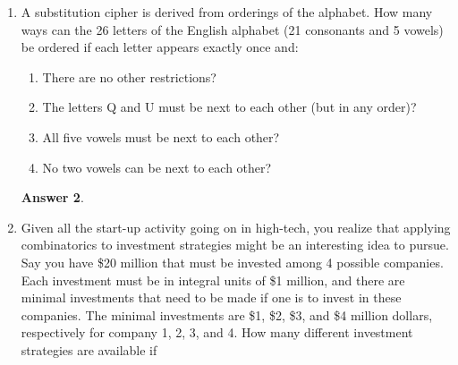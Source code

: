 \documentclass[12pt]{article}
\renewcommand{\(}{\left(}
\renewcommand{\)}{\right)}
\theoremstyle{definition}
\newtheorem*{answer}{Answer}
\begin{document}
\begin{enumerate}
\begin{enumerate}[label=\alph*.]
\item there are no additional restrictions on which species can be selected?
\item 2 particular bird species cannot be placed together (e.g., they have a predator-prey relationship)?
\item 1 particular bird species and 1 particular reptile species cannot be placed together?

\end{enumerate}

    \begin{shaded}
    \begin{answer}

    \end{answer}
    \end{shaded}
    \newpage


\item A substitution cipher is derived from orderings of the alphabet. How many ways can
the 26 letters of the English alphabet (21 consonants and 5 vowels) be ordered if each letter appears exactly once and:
    \begin{enumerate}[label=\alph*.]

    \item There are no other restrictions?
    \item The letters Q and U must be next to each other (but in any order)?
    \item All five vowels must be next to each other?
    \item No two vowels can be next to each other?

    \end{enumerate}

    \begin{shaded}
    \begin{answer}

    \end{answer}
    \end{shaded}
    \newpage


\item Given all the start-up activity going on in high-tech, you realize that applying combinatorics to investment strategies might be an interesting idea to pursue.  Say you have \$20 million that must be invested among 4 possible companies.  Each investment must be in integral units of \$1 million, and there are minimal investments that need to be made if one is to invest in these companies.  The minimal investments are \$1, \$2, \$3, and \$4 million dollars, respectively for company 1, 2, 3, and 4.  How many different investment strategies are available if
    \begin{enumerate}[label=\alph*.]


\end{enumerate}
\end{enumerate}
\end{document}
